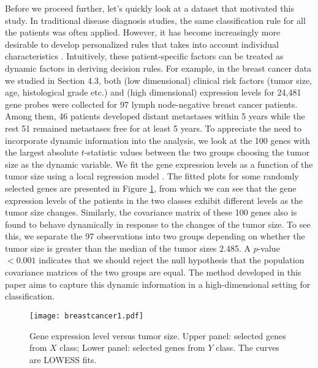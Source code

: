\documentclass[11pt]{article}
\theoremstyle{definition}
\begin{document}
 
 Before we proceed further, let's quickly look at a dataset that motivated this study. In traditional disease diagnosis studies, the same classification rule for all the patients was often applied. However, it has become increasingly more desirable to develop personalized rules that takes into account individual characteristics \citep{pm2015}. Intuitively, these patient-specific factors can be treated as dynamic factors in deriving decision rules. For example,
 in the breast cancer data we studied in Section 4.3, both (low dimensional) clinical risk factors (tumor size, age, histological grade etc.) and (high dimensional) expression levels for 24,481 gene probes were collected for 97 lymph node-negative breast cancer patients. Among them, 46 patients developed distant metastases within 5 years while the rest 51  remained metastases free for at least 5 years.
 To appreciate the need to incorporate dynamic information into the analysis, we look at the 100 genes with the largest absolute $t$-statistic values between the two groups choosing the tumor size as the dynamic variable. We fit the gene expression levels as a function of the tumor size using
 a local regression model \citep{Cleveland}. The fitted plots for some randomly selected genes are presented in Figure \ref{figgene}, from which we can see that the gene expression levels of the patients in the two classes exhibit different levels as the tumor size changes. Similarly, the covariance matrix of these 100 genes also is found to behave dynamically
 in response to the changes of the tumor size. To see this, we separate the
 97 observations into two groups depending on whether the tumor size
 is greater than the median of the tumor sizes 2.485. A $p$-value $ <0.001$ \citep{Li2012} indicates that we should reject
 the null hypothesis that the population covariance matrices of the two groups
 are equal.
 The method developed in this paper aims to capture this dynamic
 information in a high-dimensional setting for classification.
 
 \begin{figure}[htbp]
 	\centering
 	\texttt{[image: breastcancer1.pdf]}
 	\caption{Gene expression level versus tumor size. Upper panel: selected genes from $X$ class; Lower panel: selected genes from $Y$ class. The curves are LOWESS fits.}\label{figgene}
 \end{figure}
 
 
 
 
\end{document}
